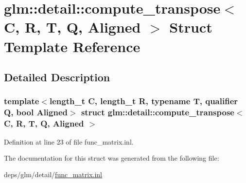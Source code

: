 \hypertarget{structglm_1_1detail_1_1compute__transpose}{}\section{glm\+:\+:detail\+:\+:compute\+\_\+transpose$<$ C, R, T, Q, Aligned $>$ Struct Template Reference}
\label{structglm_1_1detail_1_1compute__transpose}


\subsection{Detailed Description}
\subsubsection*{template$<$length\+\_\+t C, length\+\_\+t R, typename T, qualifier Q, bool Aligned$>$\newline
struct glm\+::detail\+::compute\+\_\+transpose$<$ C, R, T, Q, Aligned $>$}



Definition at line 23 of file func\+\_\+matrix.\+inl.



The documentation for this struct was generated from the following file\+:\begin{DoxyCompactItemize}
\item 
deps/glm/detail/\hyperlink{func__matrix_8inl}{func\+\_\+matrix.\+inl}\end{DoxyCompactItemize}
